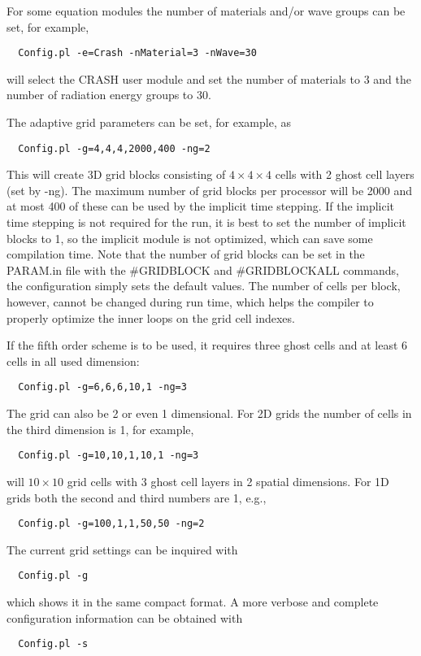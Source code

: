 For some equation modules the number of materials and/or wave groups can be set, 
for example, 
\begin{verbatim}
  Config.pl -e=Crash -nMaterial=3 -nWave=30
\end{verbatim}
will select the CRASH user module and set the number of materials to 3 and the 
number of radiation energy groups to 30.

The adaptive grid parameters can be set, for example, as
\begin{verbatim}
  Config.pl -g=4,4,4,2000,400 -ng=2
\end{verbatim}
This will create 3D grid blocks consisting of $4\times 4\times 4$ cells
with 2 ghost cell layers (set by -ng).
The maximum number of grid blocks per processor will be 2000 and at most 
400 of these can be used by the implicit time stepping. If the implicit
time stepping is not required for the run, it is best to set the number
of implicit blocks to 1, so the implicit module is not optimized, which can
save some compilation time. Note that the number of grid blocks can
be set in the PARAM.in file with the \#GRIDBLOCK and \#GRIDBLOCKALL commands,
the configuration simply sets the default values. The number of cells per
block, however, cannot be changed during run time, which helps the compiler
to properly optimize the inner loops on the grid cell indexes.

If the fifth order scheme is to be used, it requires three ghost cells
and at least 6 cells in all used dimension:
\begin{verbatim}
  Config.pl -g=6,6,6,10,1 -ng=3
\end{verbatim}
The grid can also be 2 or even 1 dimensional. For 2D grids the number
of cells in the third dimension is 1, for example,
\begin{verbatim}
  Config.pl -g=10,10,1,10,1 -ng=3
\end{verbatim}
will $10\times 10$ grid cells with 3 ghost cell layers in 2 spatial dimensions.
For 1D grids both the second and third numbers are 1, e.g., 
\begin{verbatim}
  Config.pl -g=100,1,1,50,50 -ng=2
\end{verbatim}
The current grid settings can be inquired with
\begin{verbatim}
  Config.pl -g
\end{verbatim}
which shows it in the same compact format. A more verbose and complete
configuration information can be obtained with
\begin{verbatim}
  Config.pl -s
\end{verbatim}

